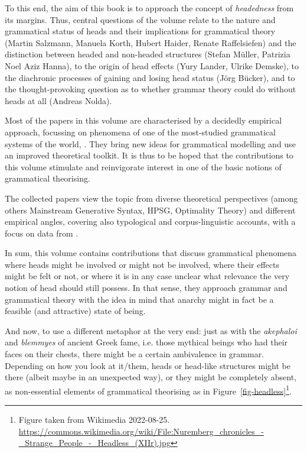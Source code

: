 \documentclass[output=paper
  ,nobabel
  ,draftmode
  ,colorlinks, citecolor=brown
]{langscibook}
\begin{document}
To this end, the aim of this book is to approach the concept of \emph{headedness} from its
margins. Thus, central questions of the volume relate to the nature and grammatical status of heads
and their implications for grammatical theory (Martin Salzmann, Manuela Korth, Hubert Haider, Renate
Raffelsiefen) and the distinction between headed and non-headed structures (Stefan Müller, Patrizia
Noel Aziz Hanna), to the origin of head effects (Yury Lander, Ulrike Demske), to the diachronic
processes of gaining and losing head status (Jörg Bücker), and to the thought-provoking question as
to whether grammar theory could do without heads at all (Andreas Nolda).

Most of the papers in this volume are characterised by a decidedly empirical approach, focussing on
phenomena of one of the most-studied grammatical systems of the world, . They bring new ideas
for grammatical modelling and use an improved theoretical toolkit. It is thus to be hoped that the
contributions to this volume stimulate and reinvigorate interest in one of the basic notions of
grammatical theorising.

\largerpage
\begin{sloppypar}
The collected papers view the topic from diverse theoretical perspectives (among others Mainstream
Generative Syntax, HPSG, Optimality Theory) and different empirical angles, covering also
typological and corpus-linguistic accounts, with a focus on data from .
\end{sloppypar}

In sum, this volume contains contributions that discuss grammatical phenomena where heads might be
involved or might not be involved, where their effects might be felt or not, or where it is in any
case unclear what relevance the very notion of head should still possess. In that sense, they
approach grammar and grammatical theory with the idea in mind that anarchy might in fact be a
feasible (and attractive) state of being.

And now, to use a different metaphor at the very end: just as with the \emph{akephaloi} and
\emph{blemmyes} of ancient Greek fame, i.e. those mythical beings who had their faces on their
chests, there might be a certain ambivalence in grammar. Depending on how you look at it/them, heads
or head-like structures might be there (albeit maybe in an unexpected way), or they might be
completely absent, as non-essential elements of grammatical theorising as in
Figure~\ref{fig-headless}\footnote{\raggedright Figure taken from Wikimedia 2022-08-25. \url{https://commons.wikimedia.org/wiki/File:Nuremberg_chronicles_-_Strange_People_-_Headless_(XIIr).jpg}}.
\end{document}
